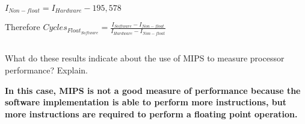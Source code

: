 \documentclass{article}
\begin{document}
\begin{adjustwidth}{2.5em}{0pt}
$I_{Non-float}=I_{Hardware}-195,578$ 

Therefore $Cycles_{Float_{Software}}=\frac{I_{Software}-I_{Non-float}}{I_{Hardware}-I_{Non-float}}$

\subsection{}
What do these results indicate about the use of MIPS to measure processor performance? Explain.

\vspace{5mm}
\textbf{In this case, MIPS is not a good measure of performance because the software implementation is able to perform more instructions, but more instructions are required to perform a floating point operation.} 
\end{adjustwidth}
\end{document}
